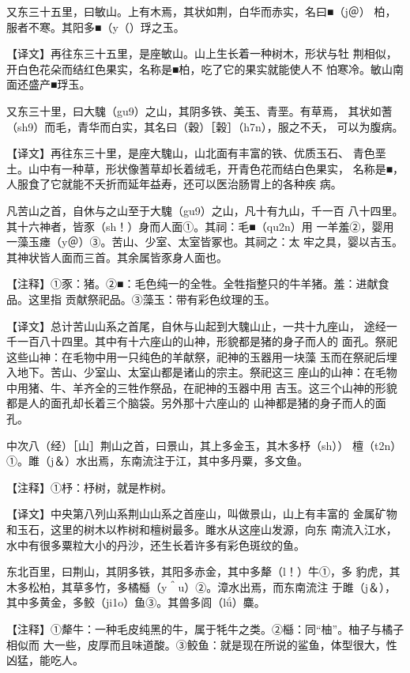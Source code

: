 \documentclass[a4paper,12pt,UTF8,twoside]{ctexbook}
\begin{document}
又东三十五里，曰敏山。上有木焉，其状如荆，白华而赤实，名曰■（j＠） 柏，服者不寒。其阳多■（y（）琈之玉。

【译文】再往东三十五里，是座敏山。山上生长着一种树木，形状与牡 荆相似，开白色花朵而结红色果实，名称是■柏，吃了它的果实就能使人不 怕寒冷。敏山南面还盛产■琈玉。

又东三十里，曰大騩（gu9）之山，其阴多铁、美玉、青垩。有草焉， 其状如蓍（sh9）而毛，青华而白实，其名曰（穀）［榖］（h7n），服之不夭， 可以为腹病。

【译文】再往东三十里，是座大騩山，山北面有丰富的铁、优质玉石、 青色垩土。山中有一种草，形状像蓍草却长着绒毛，开青色花而结白色果实， 名称是■，人服食了它就能不夭折而延年益寿，还可以医治肠胃上的各种疾 病。

凡苦山之首，自休与之山至于大騩（gu9）之山，凡十有九山，千一百 八十四里。其十六神者，皆豕（sh！）身而人面①。其祠：毛■（qu2n）用 一羊羞②，婴用一藻玉瘗（y＠）③。苦山、少室、太室皆冢也。其祠之：太 牢之具，婴以吉玉。其神状皆人面而三首。其余属皆豕身人面也。

【注释】①豕：猪。②■：毛色纯一的全牲。全牲指整只的牛羊猪。羞：进献食品。这里指 贡献祭祀品。③藻玉：带有彩色纹理的玉。

【译文】总计苦山山系之首尾，自休与山起到大騩山止，一共十九座山， 途经一千一百八十四里。其中有十六座山的山神，形貌都是猪的身子而人的 面孔。祭祀这些山神：在毛物中用一只纯色的羊献祭，祀神的玉器用一块藻 玉而在祭祀后埋入地下。苦山、少室山、太室山都是诸山的宗主。祭祀这三 座山的山神：在毛物中用猪、牛、羊齐全的三牲作祭品，在祀神的玉器中用 吉玉。这三个山神的形貌都是人的面孔却长着三个脑袋。另外那十六座山的 山神都是猪的身子而人的面孔。

中次八（经）［山］荆山之首，曰景山，其上多金玉，其木多杼（sh）） 檀（t2n）①。雎（j＆）水出焉，东南流注于江，其中多丹粟，多文鱼。

【注释】①杼：杼树，就是柞树。

【译文】中央第八列山系荆山山系之首座山，叫做景山，山上有丰富的 金属矿物和玉石，这里的树木以柞树和檀树最多。雎水从这座山发源，向东 南流入江水，水中有很多粟粒大小的丹沙，还生长着许多有彩色斑纹的鱼。

东北百里，曰荆山，其阴多铁，其阳多赤金，其中多犛（l！）牛①，多 豹虎，其木多松柏，其草多竹，多橘櫾（y＾u）②。漳水出焉，而东南流注 于雎（j＆），其中多黄金，多鲛（ji1o）鱼③。其兽多闾（lǘ）麋。

【注释】①犛牛：一种毛皮纯黑的牛，属于牦牛之类。②櫾：同“柚”。柚子与橘子相似而 大一些，皮厚而且味道酸。③鲛鱼：就是现在所说的鲨鱼，体型很大，性凶猛，能吃人。
\end{document}
